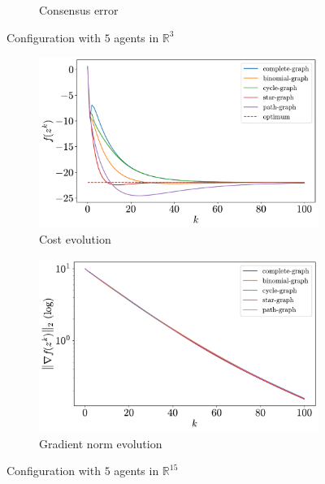 \documentclass[a4paper,11pt,oneside]{book}
\begin{document}
\begin{figure}[H]
\begin{subfigure}[t]{0.49\textwidth}
            \caption{Consensus error}
      \end{subfigure}
      \caption{Configuration with $5$ agents in $\mathbb{R}^{3}$}
\end{figure}

\begin{figure}[H]
      \centering
      \begin{subfigure}[t]{0.49\textwidth}
            \centering
            \includegraphics[width=\linewidth]{./figs/quadratic/cost_5_15_100.pdf} 
            \caption{Cost evolution}
      \end{subfigure}
      \hfill
      \begin{subfigure}[t]{0.49\textwidth}
            \centering
            \includegraphics[width=\linewidth]{./figs/quadratic/gradient_5_15_100.pdf} 
            \caption{Gradient norm evolution}
      \end{subfigure}
      \caption{Configuration with $5$ agents in $\mathbb{R}^{15}$}
\end{figure}
\end{document}
